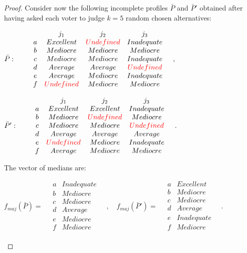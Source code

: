 \documentclass[version=3.21, pagesize, twoside=off, bibliography=totoc, DIV=calc, fontsize=12pt, a4paper]{scrartcl}
\begin{document}
\begin{proof}
	Consider now the following incomplete profiles $\bar{P}$ and $\bar{P}'$ obtained after having asked each voter to judge $k=5$ random chosen alternatives: 
	\begin{center}
		$\bar{P}: \qquad
		\begin{array}{cccc}
			& j_1 & j_2 & j_3 \\
			a &	Excellent	& {\color{red}Undefined} & Inadequate\\
			b &	Mediocre	& Mediocre	& Mediocre\\
			c &	Mediocre	& Mediocre & Inadequate\\
			d &	Average	& Average	& {\color{red}Undefined} \\
			e &	Average	& Mediocre	& Inadequate \\
			f &	{\color{red}Undefined}	& Mediocre & Mediocre	  \\
		\end{array} \quad,
		$
	\end{center}
	\begin{center}
		$\bar{P}': \qquad
		\begin{array}{cccc}
			& j_1 & j_2 & j_3 \\
			a &	Excellent	& Excellent & Inadequate\\
			b &	Mediocre	& {\color{red}Undefined}	& Mediocre\\
			c &	Mediocre	& Mediocre & {\color{red}Undefined}\\
			d &	Average	& Average	& Average \\
			e &	{\color{red}Undefined}	& Mediocre	& Inadequate \\
			f &	Average	& Mediocre & Mediocre	  \\
		\end{array} \quad.
		$
	\end{center}
	The vector of medians are:
	\begin{center}
		$f_{maj}(\bar{P})= \quad
		\begin{array}{cc}
			a &	Inadequate \\
			b &	Mediocre \\
			c &	Mediocre \\
			d &	Average	\\
			e &	Mediocre \\
			f & Mediocre \\
		\end{array} \quad,\quad%
		f_{maj}(\bar{P}')= \quad
		\begin{array}{cc}
			a &	Excellent \\
			b &	Mediocre \\
			c &	Mediocre \\
			d &	Average	\\
			e &	Inadequate \\
			f & Mediocre \\
		\end{array} \quad.
		$
	\end{center}


\end{proof}
\end{document}
